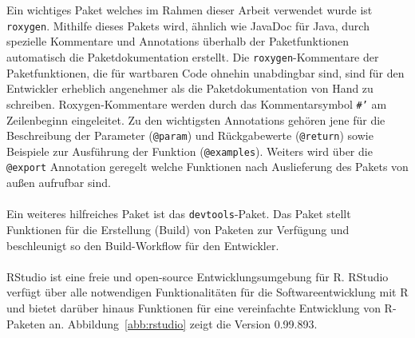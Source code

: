 \\
\\
Ein wichtiges Paket welches im Rahmen dieser Arbeit verwendet wurde ist \texttt{roxygen}. Mithilfe dieses Pakets wird, ähnlich wie JavaDoc für Java, durch spezielle Kommentare und Annotations überhalb der Paketfunktionen automatisch die Paketdokumentation erstellt. Die \texttt{roxygen}-Kommentare der Paketfunktionen, die für wartbaren Code ohnehin unabdingbar sind, sind für den Entwickler erheblich angenehmer als die Paketdokumentation von Hand zu schreiben. Roxygen-Kommentare werden durch das Kommentarsymbol \mbox{\texttt{\#'}} am Zeilenbeginn eingeleitet. Zu den wichtigsten Annotations gehören jene für die Beschreibung der Parameter (\texttt{@param}) und Rückgabewerte (\texttt{@return}) sowie Beispiele zur Ausführung der Funktion (\texttt{@examples}). Weiters wird über die \texttt{@export} Annotation geregelt welche Funktionen nach Auslieferung des Pakets von außen aufrufbar sind.
\\
\\
Ein weiteres hilfreiches Paket ist das \texttt{devtools}-Paket. Das Paket stellt Funktionen für die Erstellung (Build) von Paketen zur Verfügung und beschleunigt so den Build-Workflow für den Entwickler.
\\
\\
RStudio ist eine freie und open-source Entwicklungsumgebung für R. RStudio verfügt über alle notwendigen Funktionalitäten für die Softwareentwicklung mit R und bietet darüber hinaus Funktionen für eine vereinfachte Entwicklung von R-Paketen an. Abbildung~\ref{abb:rstudio} zeigt die Version 0.99.893. 
